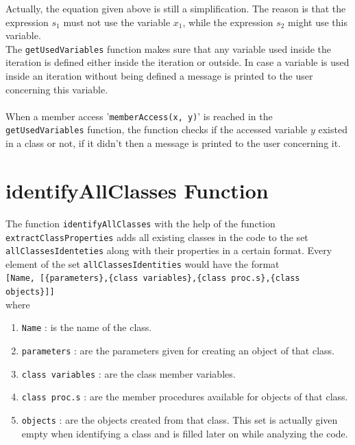 \documentclass[11pt]{report}
\begin{document}
      Actually, the equation given above is still a simplification.  The reason is that 
      the expression $s_1$ must not use the variable $x_1$, while the expression $s_2$ might use
      this variable.
\\

The \texttt{getUsedVariables} function makes sure that any variable used inside the iteration is defined either inside the iteration or outside. In case a variable is used inside an iteration without being defined a message is printed to the user concerning this variable.
\\
\\

When a member access '\texttt{memberAccess(x, y)}' is reached in the \texttt{getUsedVariables} function, the function checks if the accessed variable $y$ existed in a class or not, if it didn't then a message is printed to the user concerning it.

\section{identifyAllClasses Function}

The function \texttt{identifyAllClasses} with the help of the function \texttt{extractClassProperties} adds all existing classes in the code to the set \texttt{allClassesIdenteties} along with their properties in a certain format. Every element of the set \texttt{allClassesIdentities} would have the format
\\[0.2cm]
\hspace*{0.6cm}
\texttt{[Name, [\{parameters\},\{class variables\},\{class proc.s\},\{class objects\}]]}
\\[0.2cm]
where
\begin{enumerate}
\item \texttt{Name} : is the name of the class.
\item \texttt{parameters} : are the parameters given for creating an object of that class.
\item \texttt{class variables} : are the class member variables.
\item \texttt{class proc.s} : are the member procedures available for objects of that class.
\item \texttt{objects} : are the objects created from that class. This set is actually given empty when identifying a class and is filled later on while analyzing the code.
\end{enumerate}
\end{document}
